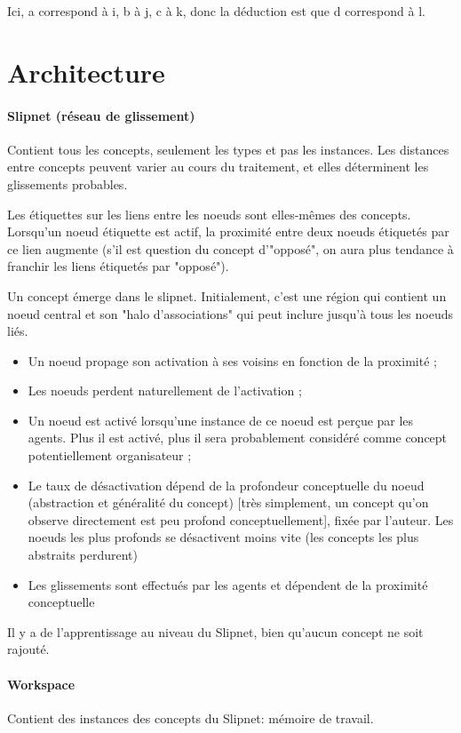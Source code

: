 \documentclass{article}           %
\begin{document}
Ici, a correspond à i, b à j, c à k, donc la déduction est que d correspond à l.

\section{Architecture}

\paragraph{Slipnet (réseau de glissement)}
Contient tous les concepts, seulement les types et pas les instances. Les distances entre concepts peuvent varier au cours du traitement, et elles déterminent les glissements probables.

Les étiquettes sur les liens entre les noeuds sont elles-mêmes des concepts. Lorsqu'un noeud étiquette est actif, la proximité entre deux noeuds étiquetés par ce lien augmente (s'il est question du concept d'"opposé", on aura plus tendance à franchir les liens étiquetés par "opposé").

Un concept émerge dans le slipnet. Initialement, c'est une région qui contient un noeud central et son "halo d'associations" qui peut inclure jusqu'à tous les noeuds liés.
\begin{itemize}
 \item Un noeud propage son activation à ses voisins en fonction de la proximité ;
 \item Les noeuds perdent naturellement de l'activation ;
 \item Un noeud est activé lorsqu'une instance de ce noeud est perçue par les agents. Plus il est activé, plus il sera probablement considéré comme concept potentiellement organisateur ;
 \item Le taux de désactivation dépend de la profondeur conceptuelle du noeud (abstraction et généralité du concept) [très simplement, un concept qu'on observe directement est peu profond conceptuellement], fixée par l'auteur. Les noeuds les plus profonds se désactivent moins vite (les concepts les plus abstraits perdurent)
 \item Les glissements sont effectués par les agents et dépendent de la proximité conceptuelle
\end{itemize}

Il y a de l'apprentissage au niveau du Slipnet, bien qu'aucun concept ne soit rajouté.

\paragraph{Workspace}
Contient des instances des concepts du Slipnet: mémoire de travail.
\end{document}
